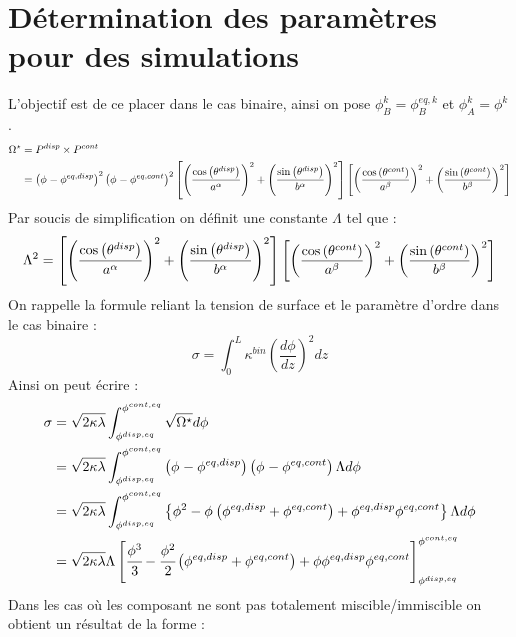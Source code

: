 \chapter{Détermination des paramètres pour des simulations}
L'objectif est de ce placer dans le cas binaire, ainsi on pose $\phi_B^k = \phi_{B}^{eq,k}$ et $\phi_A^k = \phi^{k}$
.\begin{align*} 
\Omega^{\star} &= P^{disp} \times P^{cont} \\ 
& = \left(\phi_{}-\phi_{}^{eq,disp}\right)^2\left(\phi_{}-\phi_{}^{eq,cont}\right)^2\left[ \left(\frac{\text{cos}\left(\theta^{disp}\right)}{a^\alpha}\right)^2 + \left(\frac{\text{sin}\left(\theta^{disp}\right)}{b^\alpha}\right)^2  \right]
\left[ \left(\frac{\text{cos}\left(\theta^{cont}\right)}{a^\beta}\right)^2 + \left(\frac{\text{sin}\left(\theta^{cont}\right)}{b^\beta}\right)^2  \right]
\end{align*}
Par soucis de simplification on définit une constante $\Lambda$ tel que : 
\begin{equation}
\Lambda^2 = \left[ \left(\frac{\text{cos}\left(\theta^{disp}\right)}{a^\alpha}\right)^2 + \left(\frac{\text{sin}\left(\theta^{disp}\right)}{b^\alpha}\right)^2  \right]
\left[ \left(\frac{\text{cos}\left(\theta^{cont}\right)}{a^\beta}\right)^2 + \left(\frac{\text{sin}\left(\theta^{cont}\right)}{b^\beta}\right)^2  \right]
\end{equation}
On rappelle la formule reliant la tension de surface et le paramètre d'ordre dans le cas binaire : 
\begin{equation}
\sigma = \int_0^L\kappa^{bin}\left(\frac{d\phi}{dz}\right)^2dz
\end{equation}
Ainsi on peut écrire :
\begin{align}
\sigma & = \sqrt{2\kappa\lambda}\int_{\phi^{disp,eq}}^{\phi^{cont,eq}}\sqrt{\Omega^{\star}}d\phi \\
\nonumber	& = \sqrt{2\kappa\lambda}\int_{\phi^{disp,eq}}^{\phi^{cont,eq}}\left(\phi_{}-\phi_{}^{eq,disp}\right)\left(\phi_{}-\phi_{}^{eq,cont}\right)\Lambda d\phi \\
\nonumber	& = \sqrt{2\kappa\lambda}\int_{\phi^{disp,eq}}^{\phi^{cont,eq}}\left\{\phi_{}^2 -\phi_{} \left(\phi^{eq,disp} +\phi^{eq,cont} \right) + \phi^{eq,disp}\phi^{eq,cont}\right\}\Lambda d\phi \\
\nonumber	&  = \sqrt{2\kappa\lambda} \Lambda \left[\cfrac{\phi^3}{3} - \cfrac{\phi^2}{2} \left(\phi^{eq,disp} +\phi^{eq,cont} \right) +\phi \phi^{eq,disp}\phi^{eq,cont}      \right]_{\phi^{disp,eq}}^{\phi^{cont,eq}}
\end{align}
Dans les cas où les composant ne sont pas totalement miscible/immiscible on obtient un résultat de la forme :
